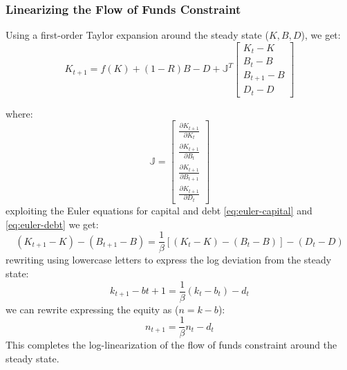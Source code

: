 \subsubsection{Linearizing the Flow of Funds Constraint}


Using a first-order Taylor expansion around the steady state (\(K, B, D\)), we get:
\begin{equation}
    K_{t+1} = f(K) + (1-R)B - D + \mathbb{J}^{T}\begin{bmatrix}
        K_t-K \\
        B_t-B \\
        B_{t+1}-B \\
        D_t-D
\end{bmatrix}
\end{equation}

where:
\begin{equation}
    \mathbb{J} = \begin{bmatrix}
        \frac{\partial K_{t+1}}{\partial K_t} \\
        \frac{\partial K_{t+1}}{\partial B_t}\\
        \frac{\partial K_{t+1}}{\partial B_{t+1}}\\
        \frac{\partial K_{t+1}}{\partial D_t}
    \end{bmatrix}
\end{equation}
exploiting the Euler equations for capital and debt \ref{eq:euler-capital} and \ref{eq:euler-debt} we get:
\begin{equation}
    (K_{t+1}-K) - (B_{t+1}-B) = \frac{1}{\beta} \left[\left(K_t - K\right) - \left(B_t - B\right)\right] - \left(D_t - D\right)
\end{equation}
rewriting using lowercase letters to express the log deviation from the steady state:
\begin{equation}
    k_{t+1} - b{t+1} = \frac{1}{\beta} \left(k_t - b_t\right) - d_t
\end{equation}
we can rewrite expressing the equity as (\(n=k-b\)):
\begin{equation}
    n_{t+1} = \frac{1}{\beta} n_t - d_t
\end{equation}
This completes the log-linearization of the flow of funds constraint around the steady state.
